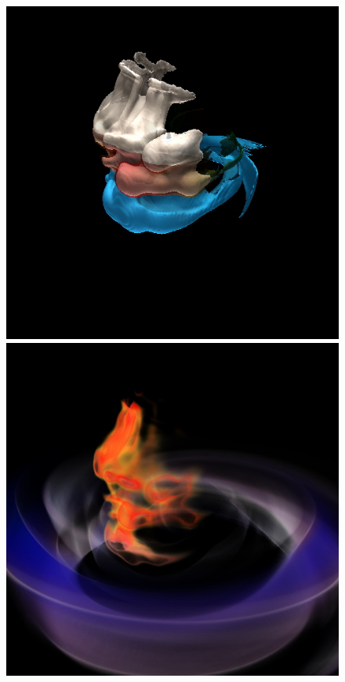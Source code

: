 \documentclass{egpubl}
\newlength{\boxheight}
\begin{document}
\begin{figure}[p]
\begin{minipage}[b][\boxheight][b]{0.24\linewidth}
\begin{minipage}[t]{0.98\linewidth}
      \includegraphics[width=\textwidth]{snapshots/space/space-only-isos.jpg}
    \end{minipage}%
    \vfill%
    \begin{minipage}[b]{0.98\linewidth}
      \centering
      \includegraphics[width=\textwidth]{snapshots/space/space-only-vols.jpg}

\end{minipage}
\end{minipage}
\end{figure}
\end{document}

